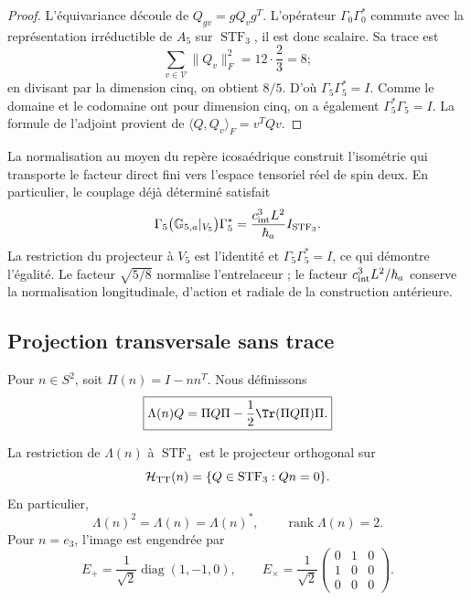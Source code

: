 \begin{proof}
L’équivariance découle de \(Q_{gv}=gQ_vg^T\). L’opérateur
\(\Gamma_0\Gamma_0^*\) commute avec la représentation irréductible de
\(A_5\) sur \(\operatorname{STF}_3\), il est donc scalaire. Sa trace
est
\[
\sum_{v\in\mathcal V}\|Q_v\|_F^2
=12\cdot\frac23=8;
\]
en divisant par la dimension cinq, on obtient \(8/5\). D’où
\(\Gamma_5\Gamma_5^*=I\). Comme le domaine et le codomaine ont pour dimension
cinq, on a également \(\Gamma_5^*\Gamma_5=I\). La formule de l’adjoint
provient de \(\langle Q,Q_v\rangle_F=v^TQv\).
\end{proof}

La normalisation au moyen du repère icosaédrique construit l’isométrie qui
transporte le facteur direct fini vers l’espace tensoriel réel de spin deux.
En particulier, le couplage déjà déterminé satisfait
\begin{equation}
 \Gamma_5\bigl(\mathbb G_{5,a}|_{V_5}\bigr)\Gamma_5^*
 =\frac{c_{\rm int}^3L^2}{\hbar_a}I_{\operatorname{STF}_3}.
 \label{eq:ii-g26-normalizacion-tensorial}
\end{equation}
La restriction du projecteur à \(V_5\) est l’identité et
\(\Gamma_5\Gamma_5^*=I\), ce qui démontre l’égalité. Le facteur
\(\sqrt{5/8}\) normalise l’entrelaceur ; le facteur
\(c_{\rm int}^3L^2/\hbar_a\) conserve la normalisation longitudinale,
d’action et radiale de la construction antérieure.

\subsection{Projection transversale sans trace}

Pour \(n\in S^2\), soit \(\Pi(n)=I-nn^T\). Nous définissons
\begin{equation}
\label{ii:pent:eq:gravity-lambda-tt}
\boxed{
\Lambda(n)Q
=\Pi Q\Pi-\frac12\Tr(\Pi Q\Pi)\Pi.}
\end{equation}

\begin{theorem}
\label{ii:pent:thm:gravity-tt}
La restriction de \(\Lambda(n)\) à \(\operatorname{STF}_3\) est le
projecteur orthogonal sur
\begin{equation}
\label{ii:pent:eq:gravity-htt}
\mathcal H_{\rm TT}(n)
=\{Q\in\operatorname{STF}_3:Qn=0\}.
\end{equation}
En particulier,
\begin{equation}
\label{ii:pent:eq:gravity-lambda-properties}
\Lambda(n)^2=\Lambda(n)=\Lambda(n)^*,
\qquad \operatorname{rank}\Lambda(n)=2.
\end{equation}
Pour \(n=e_3\), l’image est engendrée par
\begin{equation}
\label{ii:pent:eq:gravity-plus-cross}
E_+=\frac1{\sqrt2}\operatorname{diag}(1,-1,0),
\qquad
E_\times=\frac1{\sqrt2}
\begin{pmatrix}0&1&0\\1&0&0\\0&0&0\end{pmatrix}.
\end{equation}
\end{theorem}

